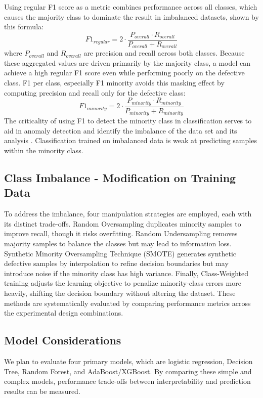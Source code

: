 \documentclass{article}
\begin{document}
Using regular F1 score as a metric combines performance across all classes, which causes the majority class to dominate the result in imbalanced datasets, shown by this formula:
$$F1_{regular} = 2 \cdot \frac{P_{overall} \cdot R_{overall}}{P_{overall} + R_{overall}}$$
where $P_{overall}$ and $R_{overall}$ are precision and recall across both classes. Because these aggregated values are driven primarily by the majority class, a model can achieve a high regular F1 score even while performing poorly on the defective class.
F1 per class, especially F1 minority avoids this masking effect by computing precision and recall only for the defective class:
$$F1_{minority} = 2 \cdot \frac{P_{minority} \cdot R_{minority}}{P_{minority} + R_{minority}}$$
The criticality of using F1 to detect the minority class in classification serves to aid in anomaly detection and identify the imbalance of the data set and its analysis \cite{sciencedirect_minority}. Classification trained on imbalanced data is weak at predicting samples within the minority class.
 
\subsection*{Class Imbalance - Modification on Training Data}
To address the imbalance, four manipulation strategies are employed, each with its distinct trade-offs. Random Oversampling duplicates minority samples to improve recall, though it risks overfitting. Random Undersampling removes majority samples to balance the classes but may lead to information loss. Synthetic Minority Oversampling Technique (SMOTE) generates synthetic defective samples by interpolation to refine decision boundaries but may introduce noise if the minority class has high variance. Finally, Class-Weighted training adjusts the learning objective to penalize minority-class errors more heavily, shifting the decision boundary without altering the dataset. These methods are systematically evaluated by comparing performance metrics across the experimental design combinations.
 
\subsection*{Model Considerations}
We plan to evaluate four primary models, which are logistic regression, Decision Tree, Random Forest, and AdaBoost/XGBoost. By comparing these simple and complex models, performance trade-offs between interpretability and prediction results can be measured.
 
\end{document}
